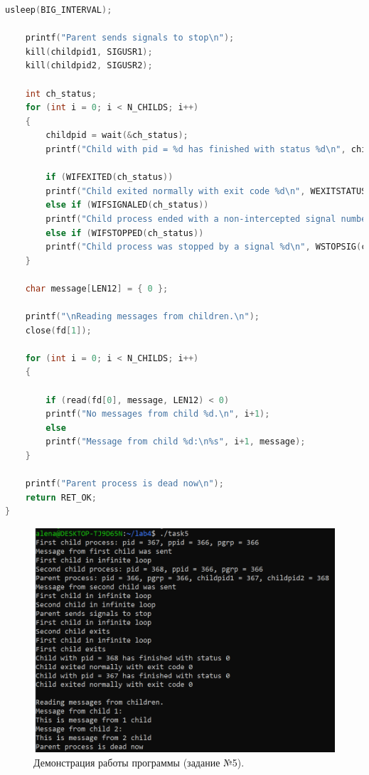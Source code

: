 \documentclass[12pt]{report}
\begin{document}
\begin{lstlisting}[label=some-code,caption=Код программы к заданию №5,language=C]
	usleep(BIG_INTERVAL);
	
	printf("Parent sends signals to stop\n"); 
	kill(childpid1, SIGUSR1);
	kill(childpid2, SIGUSR2);
	
	int ch_status;
	for (int i = 0; i < N_CHILDS; i++)
	{
		childpid = wait(&ch_status);
		printf("Child with pid = %d has finished with status %d\n", childpid, ch_status);
		
		if (WIFEXITED(ch_status))
		printf("Child exited normally with exit code %d\n", WEXITSTATUS(ch_status));
		else if (WIFSIGNALED(ch_status))
		printf("Child process ended with a non-intercepted signal number %d\n", WTERMSIG(ch_status));
		else if (WIFSTOPPED(ch_status))
		printf("Child process was stopped by a signal %d\n", WSTOPSIG(ch_status));
	}
	
	char message[LEN12] = { 0 };
	
	printf("\nReading messages from children.\n");
	close(fd[1]);
	
	for (int i = 0; i < N_CHILDS; i++)
	{
		
		if (read(fd[0], message, LEN12) < 0)
		printf("No messages from child %d.\n", i+1);
		else
		printf("Message from child %d:\n%s", i+1, message);
	}
	
	printf("Parent process is dead now\n");
	return RET_OK;
}
\end{lstlisting}

\begin{figure}[H]

	\centering

	\includegraphics[width=\linewidth]{img/task05.png}
	\caption{Демонстрация работы программы (задание №5).}

	\label{fig:task05}

\end{figure}




\end{document}
